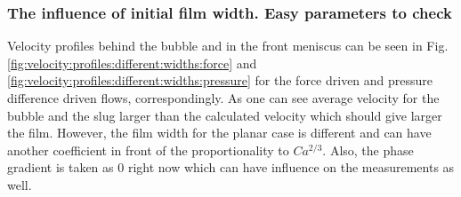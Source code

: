 \documentclass{article}
\begin{document}
\subsubsection{The influence of initial film width. Easy parameters to check}


 Velocity profiles behind the bubble and in the front
  meniscus can be seen in Fig.
\ref{fig:velocity:profiles:different:widths:force}
  and \ref{fig:velocity:profiles:different:widths:pressure} for the force driven
  and pressure difference driven flows, correspondingly. As one can see average
  velocity for the bubble and the slug larger than the calculated velocity which
  should give larger the film. However, the film width for the planar case is
  different and can have another coefficient in front of the proportionality to
  $Ca^{2/3}$. Also, the phase gradient is taken as $0$ right now which can have
  influence on the measurements as well.
\end{document}
